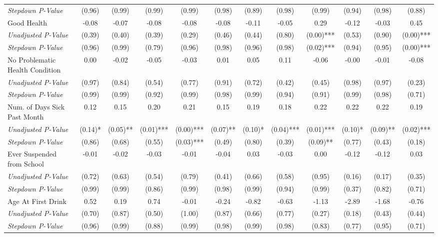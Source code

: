 \begin{tabular}{l c c c c c c c c c c c}
\quad \textit{Stepdown P-Value} & (0.96) & (0.99) & (0.99) & (0.99) & (0.98) & (0.89) & (0.98) & (0.99) & (0.94) & (0.98) & (0.88) \\
Good Health & -0.08 & -0.07 & -0.08 & -0.08 & -0.08 & -0.11 & -0.05 & 0.29 & -0.12 & -0.03 & 0.45 \\
\quad \textit{Unadjusted P-Value} & (0.39) & (0.40) & (0.39) & (0.29) & (0.46) & (0.44) & (0.80) & (0.00)*** & (0.53) & (0.90) & (0.00)*** \\
\quad \textit{Stepdown P-Value} & (0.96) & (0.99) & (0.79) & (0.96) & (0.98) & (0.96) & (0.98) & (0.02)*** & (0.94) & (0.95) & (0.00)*** \\
No Problematic Health Condition & 0.00 & -0.02 & -0.05 & -0.03 & 0.01 & 0.05 & 0.11 & -0.06 & -0.00 & -0.01 & -0.08 \\
\quad \textit{Unadjusted P-Value} & (0.97) & (0.84) & (0.54) & (0.77) & (0.91) & (0.72) & (0.42) & (0.45) & (0.98) & (0.97) & (0.23) \\
\quad \textit{Stepdown P-Value} & (0.99) & (0.99) & (0.92) & (0.99) & (0.98) & (0.99) & (0.94) & (0.91) & (0.99) & (0.98) & (0.71) \\
Num. of Days Sick Past Month & 0.12 & 0.15 & 0.20 & 0.21 & 0.15 & 0.19 & 0.18 & 0.22 & 0.22 & 0.22 & 0.19 \\
\quad \textit{Unadjusted P-Value} & (0.14)* & (0.05)** & (0.01)*** & (0.00)*** & (0.07)** & (0.10)* & (0.04)*** & (0.01)*** & (0.10)* & (0.09)** & (0.02)*** \\
\quad \textit{Stepdown P-Value} & (0.86) & (0.68) & (0.55) & (0.03)*** & (0.49) & (0.80) & (0.39) & (0.09)** & (0.77) & (0.43) & (0.18) \\
Ever Suspended from School & -0.01 & -0.02 & -0.03 & -0.01 & -0.04 & 0.03 & -0.03 & 0.00 & -0.12 & -0.12 & 0.03 \\
\quad \textit{Unadjusted P-Value} & (0.72) & (0.63) & (0.54) & (0.79) & (0.41) & (0.66) & (0.58) & (0.95) & (0.16) & (0.17) & (0.35) \\
\quad \textit{Stepdown P-Value} & (0.99) & (0.99) & (0.86) & (0.99) & (0.98) & (0.99) & (0.94) & (0.99) & (0.37) & (0.82) & (0.71) \\
Age At First Drink & 0.52 & 0.19 & 0.74 & -0.01 & -0.24 & -0.82 & -0.63 & -1.13 & -2.89 & -1.68 & -0.76 \\
\quad \textit{Unadjusted P-Value} & (0.70) & (0.87) & (0.50) & (1.00) & (0.87) & (0.66) & (0.77) & (0.27) & (0.18) & (0.43) & (0.44) \\
\quad \textit{Stepdown P-Value} & (0.96) & (0.99) & (0.88) & (0.99) & (0.98) & (0.99) & (0.98) & (0.83) & (0.77) & (0.95) & (0.71) \\
\bottomrule
\end{tabular}
